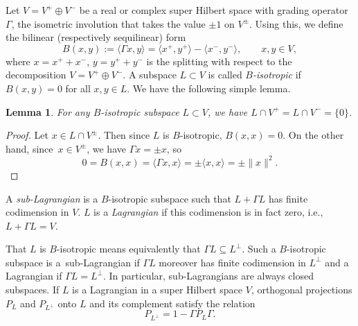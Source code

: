 \documentclass[10pt,a4paper]{amsart}
\numberwithin{equation}{section}
\newtheorem{Lemma}[Theorem]{Lemma}
\begin{document}
Let $V = V^+ \oplus V^-$ be a real or complex super Hilbert space with grading operator $\Gamma$, the isometric involution that takes the value $\pm 1$ on $V^\pm$.
Using this, we define the bilinear (respectively sequilinear) form
\begin{equation} \label{BilinearFormB}
B(x, y) := \langle \Gamma x, y\rangle = \langle x^+, y^+\rangle - \langle x^-, y^-\rangle, \qquad x, y \in V,
\end{equation}
where $x= x^+ + x^-$, $y = y^+ + y^-$ is the splitting with respect to the decomposition $V = V^+ \oplus V^-$.
A subspace $L \subset V$ is called \emph{$B$-isotropic} if $B(x, y) = 0$ for all $x, y \in L$.
We have the following simple lemma.

\begin{Lemma} \label{LemmaIntersectionZero}
For any $B$-isotropic subspace $L \subset V$, we have $L \cap V^+ = L \cap V^- = \{0\}$.
\end{Lemma}

\begin{proof}
Let $x \in L \cap V^\pm$.
Then since $L$ is $B$-isotropic, $B(x, x) = 0$.
On the other hand, since~${x \in V^\pm}$, we have $\Gamma x = \pm x$, so
\begin{equation*}
0 = B(x, x) = \langle \Gamma x, x\rangle = \pm \langle x, x\rangle = \pm\|x\|^2.\tag*{\qed}
\end{equation*}\renewcommand{\qed}{}
\end{proof}

\begin{Definition}[Lagrangians] \label{DefinitionLagrangian}
A \emph{sub-Lagrangian} is a $B$-isotropic subspace such that $L + \Gamma L$ has finite codimension in $V$.
$L$ is a \emph{Lagrangian} if this codimension is in fact zero, i.e., $L + \Gamma L = V$.
\end{Definition}

That $L$ is $B$-isotropic means equivalently that $\Gamma L \subseteq L^\perp$.
Such a $B$-isotropic subspace is a~sub-Lagrangian if $\Gamma L$ moreover has finite codimension in $L^\perp$ and a Lagrangian if $\Gamma L = L^\perp$.
In particular, sub-Lagrangians are always closed subspaces.
If $L$ is a Lagrangian in a super Hilbert space $V$, orthogonal projections $P_L$ and $P_{L^\perp}$ onto $L$ and its complement satisfy the relation
\begin{equation*}%
 P_{L^\perp} = 1 - \Gamma P_L \Gamma.
\end{equation*}
\end{document}
